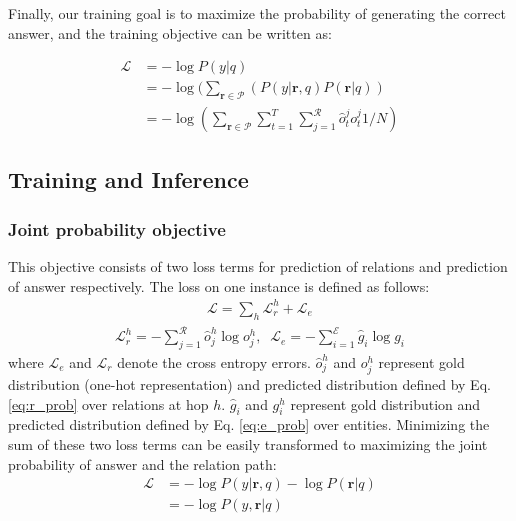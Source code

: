 Finally, our training goal is to maximize the probability of generating the correct answer, and the training objective can be written as:

\begin{equation}
\begin{aligned}
\mathcal{L} &= -\log P(y|q) \\
            &= -\log(\sum_{\mathbf{r}\in \mathcal{P}}( P(y|\mathbf{r},q)P(\mathbf{r}|q))\\
            &= -\log(\sum_{\mathbf{r}\in \mathcal{P}} \sum_{t=1}^T\sum_{j=1}^{\mathcal{R}}\hat{o}^j_t{o^j_t} 1/N)
\end{aligned}
\label{obj:latent}
\end{equation}


\subsection{Training and Inference}





\subsubsection{Joint probability objective} This objective consists of two loss terms for prediction of relations and prediction of answer respectively. The loss on one instance is defined as follows:
\begin{align}
 \mathcal{L} = \sum_{h}\mathcal{L}_r^{h} + \mathcal{L}_e 
 \end{align}
  \vspace{-3ex}
\begin{align}
 \mathcal{L}_r^{h} = -\sum_{j=1}^{\mathcal{R}}\hat{o}^h_j\log{o^h_j},\;\;\mathcal{L}_e = -\sum_{i=1}^{\mathcal{E}}\hat{g}_i\log{g_i}
\end{align}
where $\mathcal{L}_e$ and $\mathcal{L}_r$ denote the cross entropy errors. $\hat{o}^h_j$ and $o^h_j$ represent gold distribution (one-hot representation) and predicted distribution defined by Eq. \ref{eq:r_prob} over relations at hop $h$. $\hat{g}_i$ and $g^h_i$ represent gold distribution and predicted distribution defined by Eq. \ref{eq:e_prob} over entities. Minimizing the sum of these two loss terms can be easily transformed to maximizing the joint probability of answer and the relation path:
\begin{equation}
\begin{aligned}
\mathcal{L} &= -\log P(y|\mathbf{r},q) - \log P(\mathbf{r}|q) \\
            &= -\log P(y,\mathbf{r}|q)
\end{aligned}
\end{equation}

